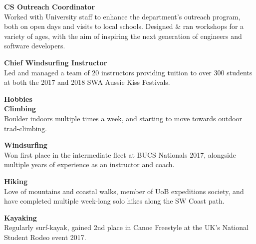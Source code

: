 \documentclass[10pt]{article}
\newcommand{\bold}[1]{\textbf{\textcolor{dark}{#1}}}
\newcommand{\sect}[1]{
\vspace{0.4em} {\LARGE\bold{#1}}\vspace{0.2em}\\}
\newcommand{\xx}[2]{{\large\bold{#1}}\\{#2}\vspace{0.5em}}
\begin{document}
\begin{minipage}[t]{0.34\textwidth}
\xx{CS Outreach Coordinator}
{Worked with University staff to enhance the department's outreach program, both on open days and visits to local schools. 
Designed \& ran workshops for a variety of ages, with the aim of inspiring the next generation of engineers and software developers.}

\xx{Chief Windsurfing Instructor}
{Led and managed a team of 20 instructors providing tuition to over 300 students at both the 2017 and 2018 SWA Aussie Kiss Festivals.}





\sect{Hobbies}

\xx{Climbing}
{Boulder indoors multiple times a week, and starting to move towards outdoor trad-climbing.}

\xx{Windsurfing}
{Won first place in the intermediate fleet at BUCS Nationals 2017, alongside multiple years of experience as an instructor and coach.}

\xx{Hiking}
{Love of mountains and coastal walks, member of UoB expeditions society, and have completed multiple week-long solo hikes along the SW Coast path.}

\xx{Kayaking}
{Regularly surf-kayak, gained 2nd place in Canoe Freestyle at the UK's National Student Rodeo event 2017.}

\end{minipage} 
\hfill
%
%
%
%
\end{document}
